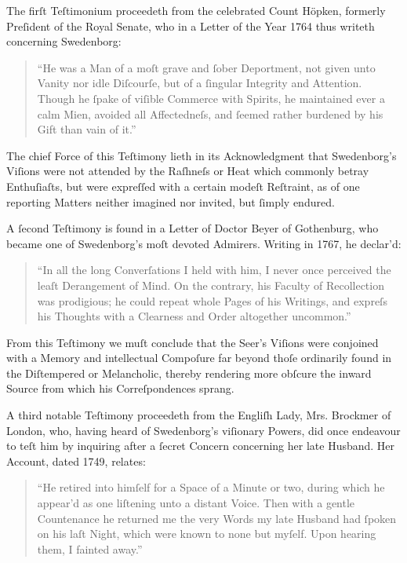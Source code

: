 \documentclass[12pt]{book}
\begin{document}
\vspace{1em}

\noindent
The firſt Teſtimonium proceedeth from the celebrated Count Höpken, formerly Preſident of the Royal Senate, who in a Letter of the Year 1764 thus writeth concerning Swedenborg:

\begin{quote}
“He was a Man of a moſt grave and ſober Deportment, not given unto Vanity nor idle Diſcourſe, but of a ſingular Integrity and Attention. Though he ſpake of viſible Commerce with Spirits, he maintained ever a calm Mien, avoided all Affectedneſs, and ſeemed rather burdened by his Gift than vain of it.”
\end{quote}

\noindent
The chief Force of this Teſtimony lieth in its Acknowledgment that Swedenborg’s Viſions were not attended by the Raſhneſs or Heat which commonly betray Enthuſiaſts, but were expreſſed with a certain modeſt Reſtraint, as of one reporting Matters neither imagined nor invited, but ſimply endured.

\vspace{1.2em}

\noindent
A ſecond Teſtimony is found in a Letter of Doctor Beyer of Gothenburg, who became one of Swedenborg’s moſt devoted Admirers. Writing in 1767, he declar’d:

\begin{quote}
“In all the long Converſations I held with him, I never once perceived the leaſt Derangement of Mind. On the contrary, his Faculty of Recollection was prodigious; he could repeat whole Pages of his Writings, and expreſs his Thoughts with a Clearness and Order altogether uncommon.”
\end{quote}

\noindent
From this Teſtimony we muſt conclude that the Seer’s Viſions were conjoined with a Memory and intellectual Compoſure far beyond thoſe ordinarily found in the Diſtempered or Melancholic, thereby rendering more obſcure the inward Source from which his Correſpondences sprang.

\vspace{1.2em}

\noindent
A third notable Teſtimony proceedeth from the Engliſh Lady, Mrs. Brockmer of London, who, having heard of Swedenborg’s viſionary Powers, did once endeavour to teſt him by inquiring after a ſecret Concern concerning her late Husband. Her Account, dated 1749, relates:

\begin{quote}
“He retired into himſelf for a Space of a Minute or two, during which he appear’d as one liſtening unto a distant Voice. Then with a gentle Countenance he returned me the very Words my late Husband had ſpoken on his laſt Night, which were known to none but myſelf. Upon hearing them, I fainted away.”
\end{quote}
\end{document}
